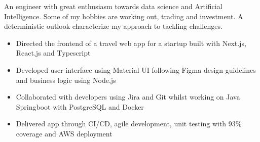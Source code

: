 \documentclass[11pt,a4paper,ragged2e]{altacv}
\begin{document}
\begin{paracol}{1}
\smallskip
{}

An engineer with great enthusiasm towards data science and Artificial Intelligence. Some of my hobbies are working out, trading and investment. A deterministic outlook characterize my approach to tackling challenges.\smallskip




\begin{itemize}
\item Directed the frontend of a travel web app for a startup built with Next.js, React.js and Typescript
\item Developed user interface using Material UI following Figma design guidelines and business logic using Node.js
\item Collaborated with developers using Jira and Git whilst working on Java Springboot with PostgreSQL and Docker
\item Delivered app through CI/CD, agile development, unit testing with 93\% coverage and AWS deployment
\end{itemize}
\tightdivider


\end{paracol}
\end{document}
